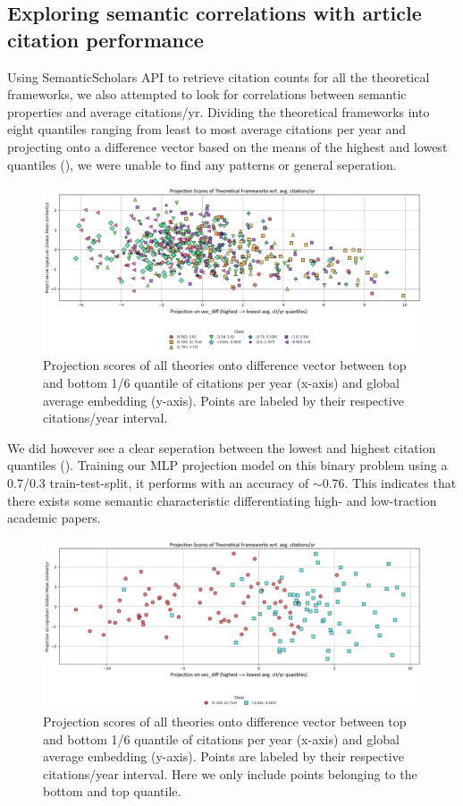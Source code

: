 \subsection{Exploring semantic correlations with article citation performance}

Using SemanticScholars API to retrieve citation counts for all the theoretical frameworks, we also attempted to look for correlations between semantic properties and average citations/yr. Dividing the theoretical frameworks into eight quantiles ranging from least to most average citations per year and projecting onto a difference vector based on the means of the highest and lowest quantiles (), we were unable to find any patterns or general seperation.


\begin{figure}
    \centering
    \includegraphics[width=.9\linewidth]{media/avgcityr_all.png}
    \caption{Projection scores of all theories onto difference vector between top and bottom 1/6 quantile of citations per year (x-axis) and global average embedding (y-axis). Points are labeled by their respective citations/year interval.}
    \label{fig:112}
\end{figure}
 We did however see a clear seperation between the lowest and highest citation quantiles (). Training our MLP projection model on this binary problem using a 0.7/0.3 train-test-split, it performs with an accuracy of $\sim$0.76. This indicates that there exists some semantic characteristic differentiating high- and low-traction academic papers.
\begin{figure}
    \centering
    \includegraphics[width=.9\linewidth]{media/avgcityr_binary.png}
    \caption{Projection scores of all theories onto difference vector between top and bottom 1/6 quantile of citations per year (x-axis) and global average embedding (y-axis). Points are labeled by their respective citations/year interval. Here we only include points belonging to the bottom and top quantile.}
    \label{fig:113}
\end{figure}
